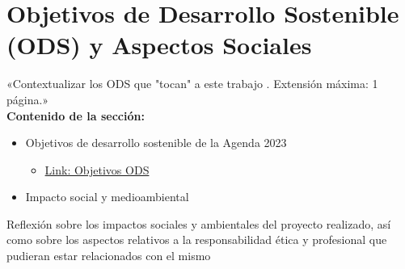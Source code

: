 \chapter{Objetivos de Desarrollo Sostenible (ODS) y Aspectos Sociales}
«Contextualizar los ODS que "tocan" a este trabajo . Extensión máxima: 1 página.»\\

\textbf{Contenido de la sección:}
\begin{itemize}
    \item Objetivos de desarrollo sostenible de la Agenda 2023
    \begin{itemize}
        \item \href{https://www.un.org/sustainabledevelopment/es/sustainable-development-goals/}{Link: Objetivos ODS}
    \end{itemize}
    \item Impacto social y medioambiental
\end{itemize}

Reflexión sobre los impactos sociales y ambientales del proyecto realizado, así como sobre los aspectos relativos a la responsabilidad ética y profesional que pudieran estar relacionados con el mismo


